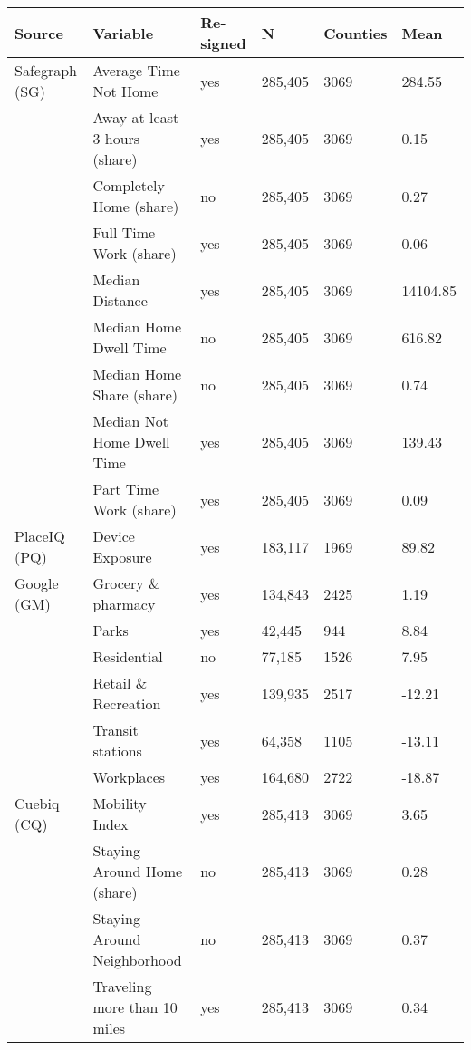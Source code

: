 \begin{tabular}{llllll}
  \toprule
Source & Variable & Re-signed & N & Counties & Mean \\ 
  \midrule
Safegraph (SG) & Average Time Not Home & yes & 285,405 & 3069 & 284.55 \\ 
   & Away at least 3 hours (share) & yes & 285,405 & 3069 & 0.15 \\ 
   & Completely Home (share) & no & 285,405 & 3069 & 0.27 \\ 
   & Full Time Work (share) & yes & 285,405 & 3069 & 0.06 \\ 
   & Median Distance & yes & 285,405 & 3069 & 14104.85 \\ 
   & Median Home Dwell Time & no & 285,405 & 3069 & 616.82 \\ 
   & Median Home Share (share) & no & 285,405 & 3069 & 0.74 \\ 
   & Median Not Home Dwell Time & yes & 285,405 & 3069 & 139.43 \\ 
   & Part Time Work (share) & yes & 285,405 & 3069 & 0.09 \\ 
  PlaceIQ (PQ) & Device Exposure & yes & 183,117 & 1969 & 89.82 \\ 
  Google (GM) & Grocery \& pharmacy & yes & 134,843 & 2425 & 1.19 \\ 
   & Parks & yes & 42,445 & 944 & 8.84 \\ 
   & Residential & no & 77,185 & 1526 & 7.95 \\ 
   & Retail \& Recreation & yes & 139,935 & 2517 & -12.21 \\ 
   & Transit stations & yes & 64,358 & 1105 & -13.11 \\ 
   & Workplaces & yes & 164,680 & 2722 & -18.87 \\ 
  Cuebiq (CQ) & Mobility Index & yes & 285,413 & 3069 & 3.65 \\ 
   & Staying Around Home (share) & no & 285,413 & 3069 & 0.28 \\ 
   & Staying Around Neighborhood & no & 285,413 & 3069 & 0.37 \\ 
   & Traveling more than 10 miles & yes & 285,413 & 3069 & 0.34 \\ 
   \bottomrule
\end{tabular}
